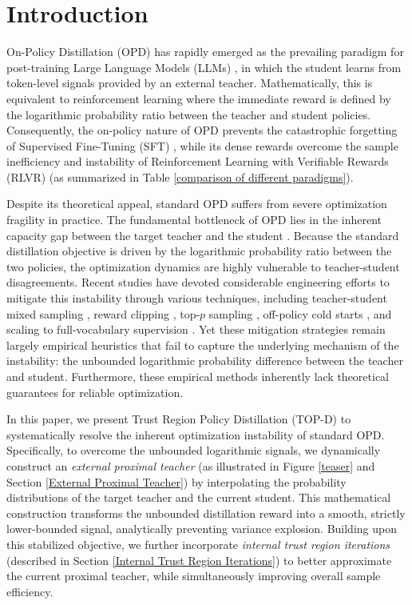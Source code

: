 \documentclass{article}
\theoremstyle{plain}
\theoremstyle{definition}
\theoremstyle{remark}
\begin{document}
\section{Introduction}
On-Policy Distillation (OPD) \citep{lu2025onpolicydistillation} has rapidly emerged as the prevailing paradigm for post-training Large Language Models (LLMs) \citep{yang2025qwen3, xiao2026mimo, zeng2026glm, yang2026nemotron, deepseekai2026deepseekv4}, in which the student learns from token-level signals provided by an external teacher. Mathematically, this is equivalent to reinforcement learning where the immediate reward is defined by the logarithmic probability ratio between the teacher and student policies. Consequently, the on-policy nature of OPD prevents the catastrophic forgetting of Supervised Fine-Tuning (SFT) \citep{shenfeld2026self}, while its dense rewards overcome the sample inefficiency and instability of Reinforcement Learning with Verifiable Rewards (RLVR) (as summarized in Table \ref{comparison of different paradigms}).

Despite its theoretical appeal, standard OPD suffers from severe optimization fragility in practice. The fundamental bottleneck of OPD lies in the inherent capacity gap between the target teacher and the student \citep{jang2026stable}. Because the standard distillation objective is driven by the logarithmic probability ratio between the two policies, the optimization dynamics are highly vulnerable to teacher-student disagreements. Recent studies have devoted considerable engineering efforts to mitigate this instability through various techniques, including teacher-student mixed sampling \citep{gu2024minillm}, reward clipping \citep{ko2026scaling}, top-$p$ sampling \citep{fu2026revisiting}, off-policy cold starts \citep{li2026rethinking}, and scaling to full-vocabulary supervision \citep{deepseekai2026deepseekv4}. Yet these mitigation strategies remain largely empirical heuristics that fail to capture the underlying mechanism of the instability: the unbounded logarithmic probability difference between the teacher and student. Furthermore, these empirical methods inherently lack theoretical guarantees for reliable optimization.

In this paper, we present Trust Region Policy Distillation (TOP-D) to systematically resolve the inherent optimization instability of standard OPD. Specifically, to overcome the unbounded logarithmic signals, we dynamically construct an \textit{external proximal teacher} (as illustrated in Figure \ref{teaser} and Section \ref{External Proximal Teacher}) by interpolating the probability distributions of the target teacher and the current student. This mathematical construction transforms the unbounded distillation reward into a smooth, strictly lower-bounded signal, analytically preventing variance explosion. Building upon this stabilized objective, we further incorporate \textit{internal trust region iterations} (described in Section \ref{Internal Trust Region Iterations}) to better approximate the current proximal teacher, while simultaneously improving overall sample efficiency.
\end{document}
